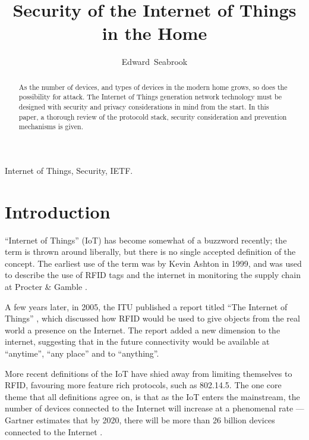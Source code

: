 \documentclass[10pt,journal,compsoc]{IEEEtran}
\begin{document}
\title{Security of the Internet of Things in the Home}
\author{Edward~Seabrook }

\maketitle


\begin{abstract}
As the number of devices, and types of devices in the modern home grows, so
does the possibility for attack. The Internet of Things generation network
technology must be designed with security and privacy considerations in mind
from the start. In this paper, a thorough review of the protocold stack,
security consideration and prevention mechanisms is given. 
\end{abstract}

\begin{IEEEkeywords}
Internet of Things, Security, IETF.
\end{IEEEkeywords}

\IEEEpeerreviewmaketitle

\section{Introduction}
 ``Internet of Things'' (IoT) has become somewhat of a
buzzword recently; the term is thrown around liberally, but there is no single
accepted definition of the concept. The earliest use of the term was by Kevin
Ashton in 1999, and was used to describe the use of RFID tags and the internet
in monitoring the supply chain at Procter \& Gamble \cite{Ashton2009}. 

A few years later, in 2005, the ITU published a report titled ``The Internet of
Things'' \cite{ITU_IoT}, which discussed how RFID would be used to give objects from the real
world a presence on the Internet. The report added a new dimension to the
internet, suggesting that in the future connectivity would be available at
``anytime'', ``any place'' and to ``anything''.

More recent definitions of the IoT have shied away from limiting themselves to
RFID, favouring more feature rich protocols, such as 802.14.5. The one core
theme that all definitions agree on, is that as the IoT enters the mainstream,
the number of devices connected to the Internet will increase at a phenomenal
rate — Gartner estimates that by 2020, there will be more than 26 billion
devices connected to the Internet \cite{Gartner2014}. 
\end{document}
